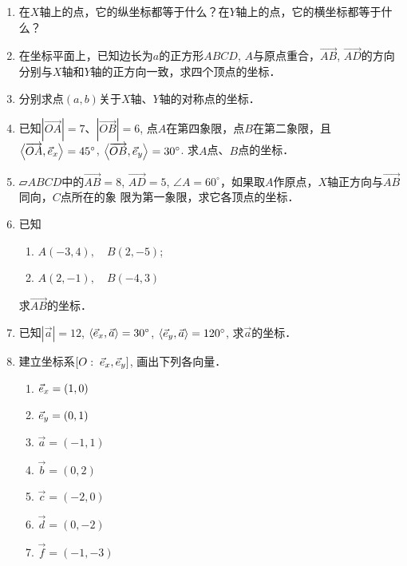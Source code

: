 \begin{enumerate}
    \item 在$X$轴上的点，它的纵坐标都等于什么？在$Y$轴上的点，它的横坐标都等于什么？
    \item 在坐标平面上，已知边长为$a$的正方形$ABCD$, $A$与原点重合，$\Vec{AB}$, $\Vec{AD}$的方向分别与$X$轴和$Y$轴的正方向一致，求四个顶点的坐标．
    \item 分别求点$(a,b)$关于$X$轴、$Y$轴的对称点的坐标．
    \item 已知$|\Vec{OA}|=7$、$|\Vec{OB}|=6$, 点$A$在第四象限，点$B$在第二象限，且$\left\langle \overrightarrow{OA},\vec{e}_x \right\rangle=45^{\circ}$, $\left\langle \overrightarrow{OB},\vec{e}_y \right\rangle=30^{\circ}$. 求$A$点、$B$点的坐标．
    \item $\parallelogram{ABCD}$中的$\Vec{AB}=8$, $\Vec{AD}=5$, $\angle A=60^{\circ}$，如果取$A$作原点，$X$轴正方向与$\Vec{AB}$同向，$C$点所在的象
    限为第一象限，求它各顶点的坐标．
    \item 已知
\begin{multicols}{2}
\begin{enumerate}
    \item $A(-3, 4),\quad B(2,-5)$; 
    \item $A(2,-1),\quad B(-4, 3)$
\end{enumerate}
\end{multicols}
    求$\Vec{AB}$的坐标．
    
\item 已知$|\vec{a}|=12$, $\left\langle \vec{e}_x,\vec{a} \right\rangle=30^{\circ}$, $\left\langle \vec{e}_y,\vec{a} \right\rangle=120^{\circ}$, 
    求$\vec{a}$的坐标．
    
    \item 建立坐标系$[O:\; \vec{e}_x,\vec{e}_y]$, 画出下列各向量．
\begin{multicols}{3}
\begin{enumerate}
    \item $\vec{e}_x=(1,0)$
    \item $\vec{e}_y=(0,1)$
    \item $\vec{a}=(-1,1)$
    \item $\vec{b}=(0,2)$
    \item $\vec{c}=(-2,0)$
    \item $\vec{d}=(0,-2)$
    \item $\vec{f}=(-1,-3)$
\end{enumerate}
\end{multicols}


\end{enumerate}
